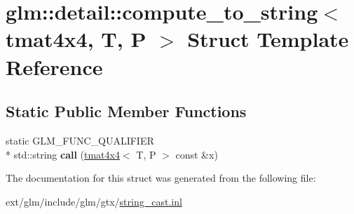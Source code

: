 \hypertarget{structglm_1_1detail_1_1compute__to__string_3_01tmat4x4_00_01_t_00_01_p_01_4}{\section{glm\-:\-:detail\-:\-:compute\-\_\-to\-\_\-string$<$ tmat4x4, T, P $>$ Struct Template Reference}
\label{structglm_1_1detail_1_1compute__to__string_3_01tmat4x4_00_01_t_00_01_p_01_4}
}
\subsection*{Static Public Member Functions}
\begin{DoxyCompactItemize}
\item 
\hypertarget{structglm_1_1detail_1_1compute__to__string_3_01tmat4x4_00_01_t_00_01_p_01_4_ac6e1968f8240ac2d9644216a7922bab2}{static G\-L\-M\-\_\-\-F\-U\-N\-C\-\_\-\-Q\-U\-A\-L\-I\-F\-I\-E\-R \\*
std\-::string {\bfseries call} (\hyperlink{structglm_1_1tmat4x4}{tmat4x4}$<$ T, P $>$ const \&x)}\label{structglm_1_1detail_1_1compute__to__string_3_01tmat4x4_00_01_t_00_01_p_01_4_ac6e1968f8240ac2d9644216a7922bab2}

\end{DoxyCompactItemize}


The documentation for this struct was generated from the following file\-:\begin{DoxyCompactItemize}
\item 
ext/glm/include/glm/gtx/\hyperlink{string__cast_8inl}{string\-\_\-cast.\-inl}\end{DoxyCompactItemize}
